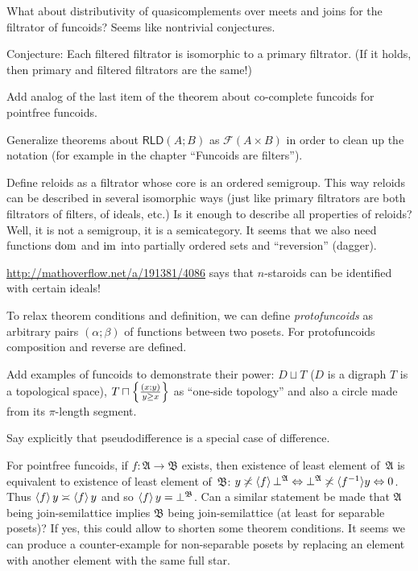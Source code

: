 \documentclass{amsart}
\begin{document}
What about distributivity of quasicomplements over meets and joins for the filtrator of funcoids? Seems like nontrivial conjectures.

Conjecture: Each filtered filtrator is isomorphic to a primary filtrator. (If it holds, then primary and filtered filtrators are the same!)

Add analog of the last item of the theorem about co-complete funcoids for pointfree funcoids.

Generalize theorems about $\mathsf{RLD}(A;B)$ as $\mathscr{F}(A\times B)$ in order to clean up the notation
(for example in the chapter ``Funcoids are filters'').

Define reloids as a filtrator whose core is an ordered semigroup.
This way reloids can be described in several isomorphic ways (just like primary filtrators are both filtrators of filters, of ideals, etc.)
Is it enough to describe all properties of reloids? Well, it is not a semigroup, it is a semicategory.
It seems that we also need functions $\operatorname{dom}$ and $\operatorname{im}$ into partially ordered sets and ``reversion'' (dagger).

\url{http://mathoverflow.net/a/191381/4086} says that $n$-staroids can be identified with certain ideals!

To relax theorem conditions and definition, we can define \emph{protofuncoids} as arbitrary pairs $(\alpha;\beta)$ of functions
between two posets. For protofuncoids composition and reverse are defined.

Add examples of funcoids to demonstrate their power:
$D\sqcup T$ ($D$ is a digraph $T$ is a topological space),
$T\sqcap\left\{ \frac{(x;y)}{y\ge x}\right\}$ as ``one-side topology'' and also a circle made from its $\pi$-length segment.

Say explicitly that pseudodifference is a special case of difference.

For pointfree funcoids, if $f:\mathfrak{A}\rightarrow\mathfrak{B}$ exists,
then existence of least element of~$\mathfrak{A}$ is equivalent to existence of least element of~$\mathfrak{B}$:
$y \not\asymp \left\langle f\right\rangle \bot^{\mathfrak{A}} \Leftrightarrow
\bot^{\mathfrak{A}} \not\asymp \langle f^{- 1} \rangle y \Leftrightarrow 0$. Thus
$\left\langle f\right\rangle y \asymp \left\langle f\right\rangle y$ and so $\left\langle f\right\rangle y =
\bot^{\mathfrak{B}}$.
Can a similar statement be made that $\mathfrak{A}$ being join-semilattice implies $\mathfrak{B}$ being join-semilattice
(at least for separable posets)? If yes, this could allow to shorten some theorem conditions.
It seems we can produce a counter-example for non-separable posets by replacing an element with another element with the same full star.
\end{document}

